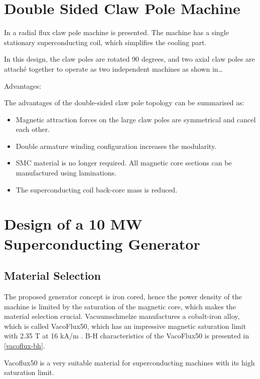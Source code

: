 \documentclass[final,peerreview,onecolumn]{IEEEtran}
\begin{document}

\section{Double Sided Claw Pole Machine}

In \cite{} a radial flux claw pole machine is presented. The machine has a single stationary superconducting coil, which simplifies the cooling part.

In this design, the claw poles are rotated 90 degrees, and two axial claw poles are attaché together to operate as two independent machines as shown in…

Advantages:

The advantages of the double-sided claw pole topology can be summarised as:

\begin{itemize}
  \item Magnetic attraction forces on the large claw poles are symmetrical and cancel each other.
  \item Double armature winding configuration increases the modularity.
  \item SMC material is no longer required. All magnetic core sections can be manufactured using laminations.
  \item The superconducting coil back-core mass is reduced.
\end{itemize}



\section{Design of a 10 MW Superconducting Generator}

\subsection{Material Selection}

The proposed generator concept is iron cored, hence the power density of the machine is limited by the saturation of the magnetic core, which makes the material selection crucial. Vacuumschmelze manufactures a cobalt-iron alloy, which is called VacoFlux50, which  has an impressive magnetic saturation limit with 2.35 T at 16 kA/m \cite{vacoflux}. B-H characteristics of the VacoFlux50 is presented in \autoref{vacoflux-bh}.

Vacoflux50 is a very suitable material for superconducting machines with its high saturation limit.
\end{document}
